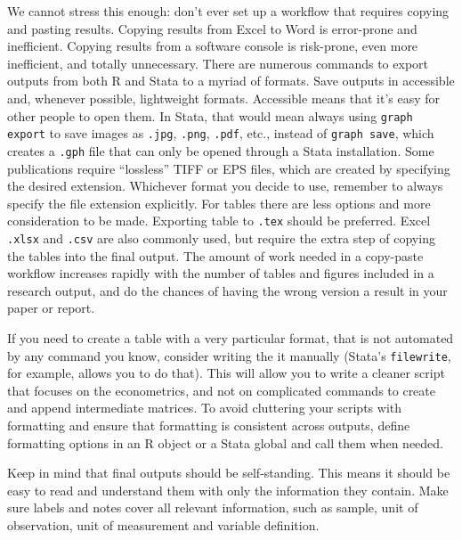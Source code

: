 We cannot stress this enough:
don't ever set up a workflow that requires copying and pasting results.
Copying results from Excel to Word is error-prone and inefficient.
Copying results from a software console is risk-prone,
even more inefficient, and totally unnecessary.
There are numerous commands to export outputs from both R and Stata to a myriad of formats.
Save outputs in accessible and, whenever possible, lightweight formats.
Accessible means that it's easy for other people to open them.
In Stata, that would mean always using \texttt{graph export} to save images as
\texttt{.jpg}, \texttt{.png}, \texttt{.pdf}, etc.,
instead of \texttt{graph save},
which creates a \texttt{.gph} file that can only be opened through a Stata installation.
Some publications require ``lossless'' TIFF or EPS files, which are created by specifying the desired extension.
Whichever format you decide to use, remember to always specify the file extension explicitly.
For tables there are less options and more consideration to be made.
Exporting table to \texttt{.tex} should be preferred.
Excel \texttt{.xlsx} and \texttt{.csv} are also commonly used,
but require the extra step of copying the tables into the final output.
The amount of work needed in a copy-paste workflow increases rapidly with the number of tables and figures included in a research output,
and do the chances of having the wrong version a result in your paper or report.

If you need to create a table with a very particular format,
that is not automated by any command you know, consider writing the it manually
(Stata's \texttt{filewrite}, for example, allows you to do that).
This will allow you to write a cleaner script that focuses on the econometrics,
and not on complicated commands to create and append intermediate matrices.
To avoid cluttering your scripts with formatting and ensure that formatting is consistent across outputs,
define formatting options in an R object or a Stata global and call them when needed.

Keep in mind that final outputs should be self-standing.
This means it should be easy to read and understand them with only the information they contain.
Make sure labels and notes cover all relevant information, such as sample,
unit of observation, unit of measurement and variable definition.

